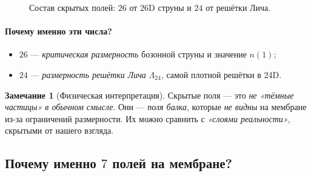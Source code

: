 \documentclass[11pt,a4paper]{article}
\newcommand{\Nhidden}{N_{\text{hidden}}}
\theoremstyle{definition}
\newtheorem{remark}[theorem]{Замечание}
\begin{document}
\begin{figure}[htbp]
\centering
{}
\caption{Состав скрытых полей: $26$ от $26$D струны и $24$ от 
решётки Лича.}
\label{fig:hidden-fields}
\end{figure}

\paragraph{Почему именно эти числа?}
\begin{itemize}
    \item $26$ — \emph{критическая размерность} бозонной струны 
          и значение $n(1)$;
    \item $24$ — \emph{размерность решётки Лича} $\Lambda_{24}$, 
          самой плотной решётки в 24D.
\end{itemize}

\begin{remark}[Физическая интерпретация]
\label{rem:hidden-physics}
Скрытые поля — это \emph{не «тёмные частицы» в обычном смысле}. 
Они — \emph{поля балка}, которые \emph{не видны} на мембране 
из-за ограничений размерности. Их можно сравнить с 
\emph{«слоями реальности»}, скрытыми от нашего взгляда.
\end{remark}

\subsection{Почему именно $7$ полей на мембране?}
\label{subsec:why-seven}
\end{document}
